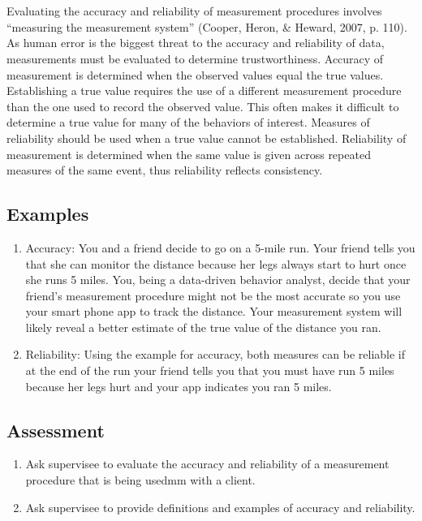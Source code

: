 \section[\fouraNine{}]{\fouraNine{}%
              }
Evaluating the accuracy and reliability of measurement procedures involves ``measuring the measurement system'' (Cooper, Heron, \& Heward, 2007, p. 110). As human error is the biggest threat to the accuracy and reliability of data, measurements must be evaluated to determine trustworthiness.  Accuracy of measurement is determined when the observed values equal the true values.  Establishing a true value requires the use of a different measurement procedure than the one used to record the observed value.  This often makes it difficult to determine a true value for many of the behaviors of interest.  Measures of reliability should be used when a true value cannot be established.  Reliability of measurement is determined when the same value is given across repeated measures of the same event, thus reliability reflects consistency. 
%
\subsection{Examples}
\begin{enumerate}
\item Accuracy: You and a friend decide to go on a 5-mile run.  Your friend tells you that she can monitor the distance because her legs always start to hurt once she runs 5 miles.  You, being a data-driven behavior analyst, decide that your friend's measurement procedure might not be the most accurate so you use your smart phone app to track the distance.  Your measurement system will likely reveal a better estimate of the true value of the distance you ran.
\item Reliability: Using the example for accuracy, both measures can be reliable if at the end of the run your friend tells you that you must have run 5 miles because her legs hurt and your app indicates you ran 5 miles.   
\end{enumerate}
%
\subsection{Assessment}
\begin{enumerate}
\item Ask supervisee to evaluate the accuracy and reliability of a measurement procedure that is being usedmm with a client.
\item Ask supervisee to provide definitions and examples of accuracy and reliability.
\end{enumerate}
%
